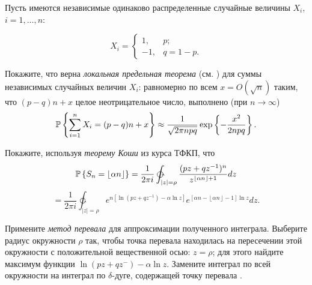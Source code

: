 \begin{problem}
Пусть имеются независимые одинаково распределенные случайные величины $X_i$, $i=1,\dots,n$:

\[X_{i} =\left\{\begin{array}{cc} {1,} & {p;} \\ {-1,} & {q=1-p.} \end{array}\right. \] 

Покажите, что верна {\it локальная предельная теорема} (см. \cite{2}) для суммы независимых случайных величин $X_i$: равномерно по всем $x=O\left(\sqrt{n} \right)$ таким, что $(p-q)n+x$ целое неотрицательное число, выполнено (при $n\to\infty$)
\[\mathrm{{\mathbb P}}\left\{\sum _{i=1}^{n}X_{i} =(p-q)n+x \right\}\approx \frac{1}{\sqrt{2\pi npq} } \exp \left\{-\frac{x^{2} }{2npq} \right\}.\] 
\end{problem}
\begin{ordre} Покажите, используя \textit{теорему Коши} из курса ТФКП, что
$$\PR\left\{S_{n} =\left\lfloor \alpha n\right\rfloor \right\}=\frac{1}{2\pi i}     \ointctrclockwise _{|z|=\rho }\frac{(pz+qz^{-1} )^{n} }{z^{\left\lfloor \alpha n\right\rfloor +1} } dz$$
$$=\frac{1}{2\pi i} \ointctrclockwise  _{|z|=\rho }e^{n\left[\ln (pz+qz^{-1} )-\alpha \ln z\right]} e^{\left[\alpha n-\left\lfloor \alpha n\right\rfloor -1\right]\ln z} dz.$$


Примените \textit{метод перевала} для аппроксимации полученного интеграла. Выберите радиус окружности $\rho $ так, чтобы точка перевала находилась на пересечении этой окружности с положительной вещественной осью: $z=\rho $; для этого найдите максимум функции $\ln (pz+qz^{-} )-\alpha \ln z$. Замените интеграл по всей окружности на интеграл по $\delta $-дуге, содержащей точку перевала \cite{27}.
\end{ordre}


